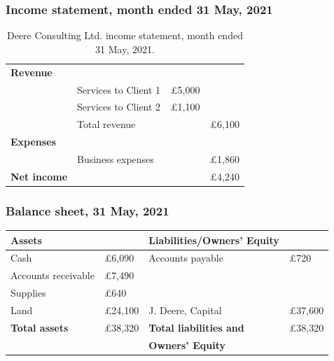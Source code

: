 \subsubsection{Income statement, month ended 31 May, 2021}
\begin{table}[H]
    \centering
    \begin{tabular}{@{}llll@{}}
        \toprule
        \textbf{Revenue}    &                      &               &               \\
                            & Services to Client 1 & \pounds 5,000 &               \\
                            & Services to Client 2 & \pounds 1,100 &               \\
                            & Total revenue        &               & \pounds 6,100 \\
        \midrule
        \textbf{Expenses}   &                      &               &               \\
                            & Business expenses    &               & \pounds 1,860 \\
        \midrule
        \textbf{Net income} &                      &               & \pounds 4,240 \\
        \bottomrule
    \end{tabular}
    \caption{Deere Consulting Ltd. income statement, month ended 31 May, 2021.}
\end{table}
\subsubsection{Balance sheet, 31 May, 2021}
\begin{table}[H]
    \centering
    \begin{tabular}{@{}llll@{}}
        \toprule
        \textbf{Assets}       &                & \textbf{Liabilities/Owners' Equity}                  \\
        \midrule
        Cash                  & \pounds 6,090  & Accounts payable                    & \pounds 720    \\
        Accounts receivable   & \pounds 7,490  &                                     &                \\
        Supplies              & \pounds 640    &                                     &                \\
        Land                  & \pounds 24,100 & J. Deere, Capital                   & \pounds 37,600 \\
        \midrule
        \textbf{Total assets} & \pounds 38,320 & \textbf{Total liabilities and}      & \pounds 38,320 \\
                              &                & \textbf{Owners' Equity}             &                \\
        \bottomrule
    \end{tabular}
\end{table}
